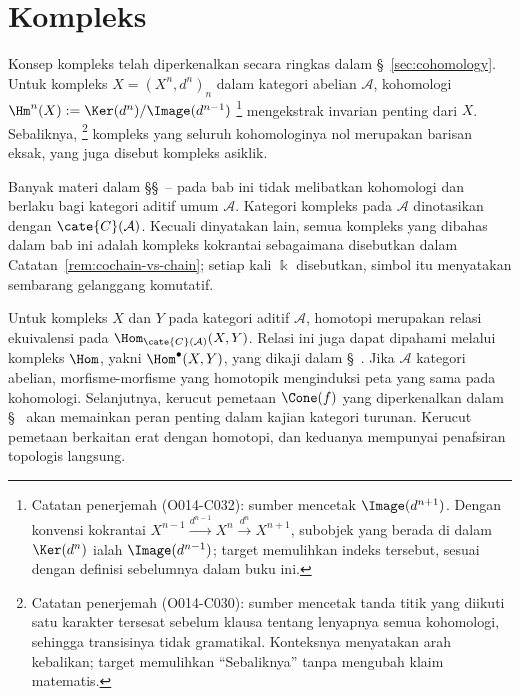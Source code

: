 
\chapter{Kompleks}\label{sec:cplx}
\hypertarget{o014.aljabr2.chapter3.overview}{ }

Konsep kompleks telah diperkenalkan secara ringkas dalam
\S~\ref{sec:cohomology}. Untuk kompleks $X=(X^n,d^n)_n$ dalam kategori
abelian $\mathcal{A}$, kohomologi
$\Hm^n(X):=\Ker(d^n)/\Image(d^{n-1})$%
\footnote{Catatan penerjemah (O014-C032): sumber mencetak
$\Image(d^{n+1})$. Dengan konvensi kokrantai
$X^{n-1}\xrightarrow{d^{n-1}}X^n\xrightarrow{d^n}X^{n+1}$, subobjek yang
berada di dalam $\Ker(d^n)$ ialah $\Image(d^{n-1})$; target memulihkan indeks
tersebut, sesuai dengan definisi sebelumnya dalam buku ini.}
mengekstrak invarian penting dari $X$. Sebaliknya,%
\footnote{Catatan penerjemah (O014-C030): sumber mencetak tanda titik yang
diikuti satu karakter tersesat sebelum klausa tentang lenyapnya semua
kohomologi, sehingga transisinya tidak gramatikal. Konteksnya menyatakan arah
kebalikan; target memulihkan ``Sebaliknya'' tanpa mengubah klaim matematis.}
kompleks yang seluruh kohomologinya nol merupakan barisan eksak, yang juga
disebut kompleks asiklik.

Banyak materi dalam
\S\S~--%
 pada bab ini tidak melibatkan
kohomologi dan berlaku bagi kategori aditif umum $\mathcal{A}$. Kategori
kompleks pada $\mathcal{A}$ dinotasikan dengan $\cate{C}(\mathcal{A})$.
Kecuali dinyatakan lain, semua kompleks yang dibahas dalam bab ini adalah
kompleks kokrantai sebagaimana disebutkan dalam
Catatan~\ref{rem:cochain-vs-chain}; setiap kali $\Bbbk$ disebutkan, simbol itu
 menyatakan sembarang gelanggang komutatif.

Untuk kompleks $X$ dan $Y$ pada kategori aditif $\mathcal{A}$, homotopi
merupakan relasi ekuivalensi pada
$\Hom_{\cate{C}(\mathcal{A})}(X,Y)$. Relasi ini juga dapat dipahami melalui
kompleks $\Hom$, yakni $\Hom^\bullet(X,Y)$, yang dikaji dalam
\S~. Jika $\mathcal{A}$ kategori abelian,
morfisme-morfisme yang homotopik menginduksi peta yang sama pada kohomologi.
Selanjutnya, kerucut pemetaan $\Cone(f)$ yang diperkenalkan dalam
\S~ akan memainkan peran penting dalam
kajian kategori turunan. Kerucut pemetaan berkaitan erat dengan homotopi, dan
keduanya mempunyai penafsiran topologis langsung.

